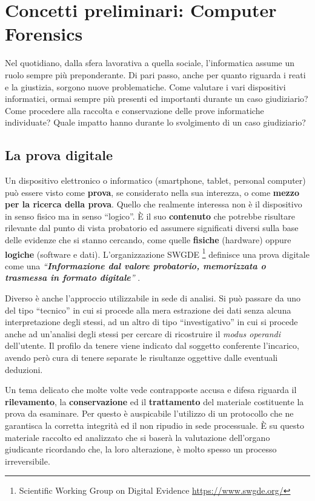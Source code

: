 \chapter{Concetti preliminari: Computer Forensics}


Nel quotidiano, dalla sfera lavorativa a quella sociale, l'informatica assume un ruolo sempre più preponderante. Di pari passo, anche per quanto riguarda i reati e la giustizia, sorgono nuove problematiche. Come valutare i vari dispositivi informatici, ormai sempre più presenti ed importanti durante un caso giudiziario? Come procedere alla raccolta e conservazione delle prove informatiche individuate? Quale impatto hanno durante lo svolgimento di un caso giudiziario? \nocite{Florindi}

\section{La prova digitale}

Un dispositivo elettronico o informatico (smartphone, tablet, personal computer) può essere visto come \textbf{prova}, se considerato nella sua interezza, o come \textbf{mezzo per la ricerca della prova}. Quello che realmente interessa non è il dispositivo in senso fisico ma in senso ``logico''. \`E il suo \textbf{contenuto} che potrebbe risultare rilevante dal punto di vista probatorio ed assumere significati diversi sulla base delle evidenze che si stanno cercando, come quelle \textbf{fisiche} (hardware) oppure \textbf{logiche} (software e dati). L'organizzazione SWGDE \footnote{Scientific Working Group on Digital Evidence \url{https://www.swgde.org/}} definisce una prova digitale come una \textit{``\textbf{Informazione dal valore probatorio, memorizzata o trasmessa in formato digitale}''} \cite{Swdge}.

Diverso è anche l'approccio utilizzabile in sede di analisi. Si può passare da uno del tipo ``tecnico'' in cui si procede alla mera estrazione dei dati senza alcuna interpretazione degli stessi, ad un altro di tipo ``investigativo'' in cui si procede anche ad un'analisi degli stessi per cercare di ricostruire il \textit{modus operandi} dell'utente. Il profilo da tenere viene indicato dal soggetto conferente l'incarico, avendo però cura di tenere separate le risultanze oggettive dalle eventuali deduzioni.

Un tema delicato che molte volte vede contrapposte accusa e difesa riguarda il \textbf{rilevamento}, la \textbf{conservazione} ed il \textbf{trattamento} del materiale costituente la prova da esaminare. Per questo è auspicabile l'utilizzo di un protocollo che ne garantisca la corretta integrità ed il non ripudio in sede processuale. \`E su questo materiale raccolto ed analizzato che si baserà la valutazione dell'organo giudicante ricordando che, la loro alterazione, è molto spesso un processo irreversibile.

